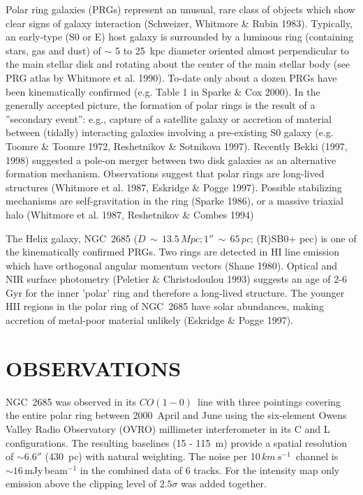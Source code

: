 \documentclass{aastex}
\newcommand{\COe}{$CO(1-0)$}
\newcommand{\kms}{km\,s^{-1}}
\begin{document}
Polar ring galaxies (PRGs) represent an unusual, rare class of objects
which show clear signs of galaxy interaction (Schweizer, Whitmore \&
Rubin 1983). Typically, an early-type (S0 or E) host galaxy is
surrounded by a luminous ring (containing stars, gas and dust) of
$\sim$ 5 to 25~kpc diameter oriented almost perpendicular to the main
stellar disk and rotating about the center of the main stellar body
(see PRG atlas by Whitmore et al. 1990). To-date only about a dozen
PRGs have been kinematically confirmed (e.g. Table 1 in Sparke \& Cox
2000). In the generally accepted picture, the formation of polar
rings is the result of a ''secondary event'': e.g., capture of a
satellite galaxy or accretion of material between (tidally)
interacting galaxies involving a pre-existing S0 galaxy (e.g. Toomre
\& Toomre 1972, Reshetnikov \& Sotnikova 1997). Recently Bekki (1997,
1998) suggested a pole-on merger between two disk galaxies as an
alternative formation mechanism. Observations suggest that polar
rings are long-lived structures (Whitmore et al. 1987, Eskridge \&
Pogge 1997). Possible stabilizing mechanisms are self-gravitation in
the ring (Sparke 1986), or a massive triaxial halo (Whitmore et
al. 1987, Reshetnikov \& Combes 1994)

The Helix galaxy, NGC~2685 ($D\,\sim\,13.5\,Mpc; 1''\,\sim\,65\,pc$;
(R)SB0+ pec) is one of the kinematically confirmed PRGs. Two rings are
detected in HI line emission which have orthogonal angular momentum
vectors (Shane 1980).  Optical and NIR surface photometry (Peletier \&
Christodoulou 1993) suggests an age of 2-6 Gyr for the inner 'polar'
ring and therefore a long-lived structure. The younger HII regions in
the polar ring of NGC~2685 have solar abundances, making accretion of
metal-poor material unlikely (Eskridge \& Pogge 1997).

\section{OBSERVATIONS}

NGC~2685 was observed in its \COe\ line with three pointings covering
the entire polar ring between 2000~April and June using the
six-element Owens Valley Radio Observatory (OVRO) millimeter
interferometer in its C and L configurations. The resulting baselines
(15 - 115~m) provide a spatial resolution of $\sim 6.6''$ (430~pc)
with natural weighting.  The noise per 10\,$\kms$\ channel is $\sim
16$\,mJy\,beam$^{-1}$ in the combined data of 6 tracks. For the
intensity map only emission above the clipping level of $2.5\sigma$
was added together.
\end{document}
